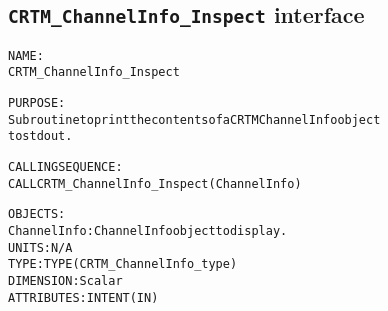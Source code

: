 \subsection{\texttt{CRTM\_ChannelInfo\_Inspect} interface}
  \label{sec:CRTM_ChannelInfo_Inspect_interface}
  \begin{alltt}
 
  NAME:
        CRTM_ChannelInfo_Inspect
 
  PURPOSE:
        Subroutine to print the contents of a CRTM ChannelInfo object
        to stdout.
 
  CALLING SEQUENCE:
        CALL CRTM_ChannelInfo_Inspect( ChannelInfo )
 
  OBJECTS:
        ChannelInfo:   ChannelInfo object to display.
                       UNITS:      N/A
                       TYPE:       TYPE(CRTM_ChannelInfo_type)
                       DIMENSION:  Scalar
                       ATTRIBUTES: INTENT(IN)
 
  \end{alltt}
